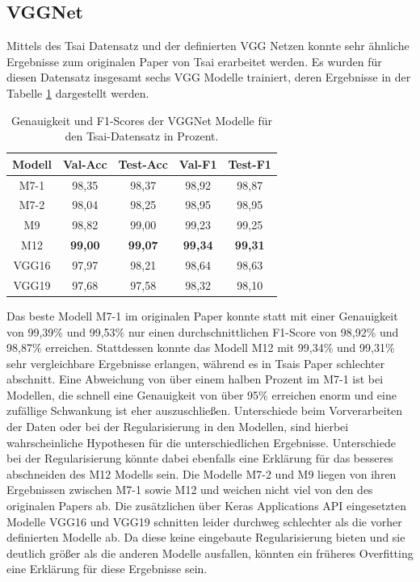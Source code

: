 \documentclass[twoside,a4paper]{IEEEtran}
\begin{document}
\subsection{VGGNet}

Mittels des Tsai Datensatz und der definierten VGG Netzen konnte sehr ähnliche Ergebnisse zum originalen Paper von Tsai erarbeitet werden. Es wurden für diesen Datensatz insgesamt sechs VGG Modelle trainiert, deren Ergebnisse in der Tabelle \ref{vgg_ergebnis_tsai} dargestellt werden.
\begin{table}[!htb]
	\caption{Genauigkeit und F1-Scores der VGGNet Modelle für den Tsai-Datensatz in Prozent.}
	\label{vgg_ergebnis_tsai}
	\centering
	\begin{tabular}{|c|c|c|c|c|}
		\hline
		Modell & Val-Acc & Test-Acc & Val-F1 & Test-F1\\
		\hline
		\hline
		M7-1 & 98,35 & 98,37 & 98,92 & 98,87\\
		\hline
		M7-2 & 98,04 & 98,25 & 98,95 & 98,95\\
		\hline
		M9 & 98,82 & 99,00 & 99,23 & 99,25\\
		\hline 
		M12 & \textbf{99,00} & \textbf{99,07} & \textbf{99,34} & \textbf{99,31}\\
		\hline 
		VGG16 & 97,97 & 98,21 & 98,64 & 98,63\\
		\hline 
		VGG19 & 97,68 & 97,58 & 98,32 & 98,10\\
		\hline 
	\end{tabular}
\end{table}

Das beste Modell M7-1 im originalen Paper konnte statt mit einer Genauigkeit von 99,39\% und 99,53\% nur einen durchschnittlichen F1-Score von 98,92\% und 98,87\% erreichen. Stattdessen konnte das Modell M12 mit 99,34\% und 99,31\% sehr vergleichbare Ergebnisse erlangen, während es in Tsais Paper schlechter abschnitt. Eine Abweichung von über einem halben Prozent im M7-1 ist bei Modellen, die schnell eine Genauigkeit von über 95\% erreichen enorm und eine zufällige Schwankung ist eher auszuschließen. Unterschiede beim Vorverarbeiten der Daten oder bei der Regularisierung in den Modellen, sind hierbei wahrscheinliche Hypothesen für die unterschiedlichen Ergebnisse. Unterschiede bei der Regularisierung könnte dabei ebenfalls eine Erklärung für das besseres abschneiden des M12 Modells sein. Die Modelle M7-2 und M9 liegen von ihren Ergebnissen zwischen M7-1 sowie M12 und weichen nicht viel von den des originalen Papers ab. Die zusätzlichen über Keras Applications API eingesetzten Modelle VGG16 und VGG19 schnitten leider durchweg schlechter als die vorher definierten Modelle ab. Da diese keine eingebaute Regularisierung bieten \cite{keras_vgg} und sie deutlich größer als die anderen Modelle ausfallen, könnten ein früheres Overfitting eine Erklärung für diese Ergebnisse sein.
\end{document}
